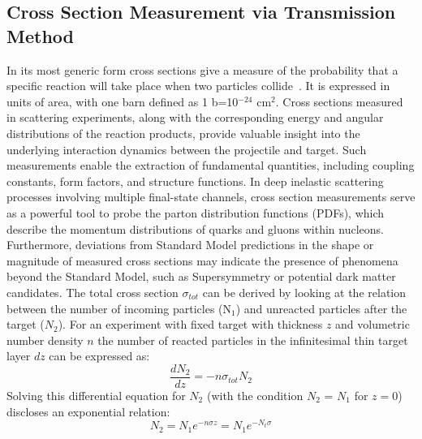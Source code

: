 \subsection{Cross Section Measurement via Transmission Method}\label{section:transmission_method}
In its most generic form cross sections give a measure of the probability that a specific reaction will take place when two particles collide~\cite{bethge2007wiedemann}. It is expressed in units of area, with one barn defined as 1 b=10$^{-24}$ cm$^2$. Cross sections measured in scattering experiments, along with the corresponding energy and angular distributions of the reaction products, provide valuable insight into the underlying interaction dynamics between the projectile and target. Such measurements enable the extraction of fundamental quantities, including coupling constants, form factors, and structure functions.\newline
In deep inelastic scattering processes involving multiple final-state channels, cross section measurements serve as a powerful tool to probe the parton distribution functions (PDFs), which describe the momentum distributions of quarks and gluons within nucleons. Furthermore, deviations from Standard Model predictions in the shape or magnitude of measured cross sections may indicate the presence of phenomena beyond the Standard Model, such as Supersymmetry or potential dark matter candidates.\newline
The total cross section $\sigma_{tot}$ can be derived by looking at the relation between the number of incoming particles (N$_{1}$) and unreacted particles after the target ($N_{2}$). For an experiment with fixed target with thickness $z$ and volumetric number density $n$ the number of reacted particles in the infinitesimal thin target layer $dz$ can be expressed as:
\begin{equation}
\frac{dN_{2}}{dz} = -n \sigma_{tot} N_{2}
\end{equation}
Solving this differential equation for $N_{2}$ (with the condition $N_{2}$ = $N_{1}$ for $z=0$) discloses an exponential relation:
\begin{equation}
N_{2} = N_{1}e^{-n\sigma z}  = N_{1}e^{-N_t\sigma}
\label{eq:cross_sec}
\end{equation} 
